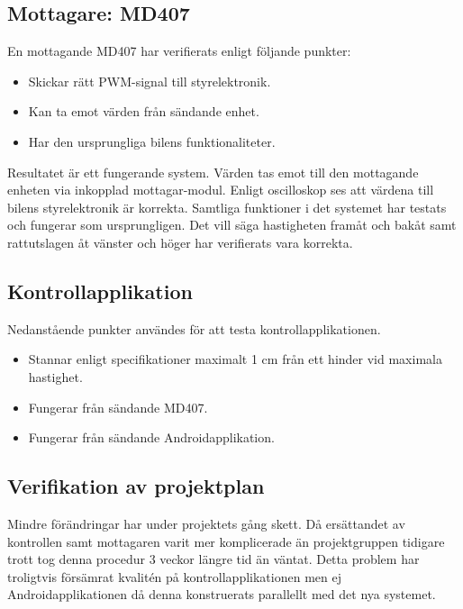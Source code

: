 \documentclass[a4paper]{article}
\begin{document}
\subsection{Mottagare: MD407}
En mottagande MD407 har verifierats enligt följande punkter:

\begin{itemize}
\item Skickar rätt PWM-signal till styrelektronik.
\item Kan ta emot värden från sändande enhet.
\item Har den ursprungliga bilens funktionaliteter.
\end{itemize}

\noindent

\vspace{5mm} \noindent
Resultatet är ett fungerande system. Värden tas emot till den mottagande enheten via inkopplad mottagar-modul. Enligt oscilloskop ses att värdena till bilens styrelektronik är korrekta. Samtliga funktioner i det systemet har testats och fungerar som ursprungligen. Det vill säga hastigheten framåt och bakåt samt rattutslagen åt vänster och höger har verifierats vara korrekta.




\subsection{Kontrollapplikation}
Nedanstående punkter användes för att testa kontrollapplikationen.

\begin{itemize}
\item Stannar enligt specifikationer maximalt 1 cm från ett hinder vid maximala hastighet.
\item Fungerar från sändande MD407.
\item Fungerar från sändande Androidapplikation.
\end{itemize}




\subsection{Verifikation av projektplan}
Mindre förändringar har under projektets gång skett. Då ersättandet av kontrollen samt mottagaren varit mer komplicerade än projektgruppen tidigare trott tog denna procedur 3 veckor längre tid än väntat. Detta problem har troligtvis försämrat kvalitén på kontrollapplikationen men ej Androidapplikationen då denna konstruerats parallellt med det nya systemet.
\end{document}
